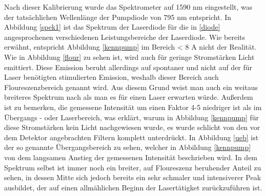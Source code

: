 Nach dieser Kalibrierung wurde das Spektrometer auf 1590 nm eingestellt, was der tatsächlichen Wellenlänge der Pumpdiode von 795 nm entspricht. \newline
In Abbildung \ref{spek1} ist das Spektrum der Laserdiode für die in \ref{diode} angesprochenen verschiedenen Leistungsbereiche der Laserdiode. Wie bereits erwähnt, entspricht Abbildung \ref{kennpump} im Bereich \newline < 8 A nicht der Realität. Wie in Abbildung \ref{flour} zu sehen ist, wird auch für geringe Stromstärken Licht emittiert. Diese Emission beruht allerdings auf spontaner und nicht auf der für Laser benötigten stimulierten Emission, weshalb dieser Bereich auch Floureszenzbereich genannt wird. Aus diesem Grund weist man auch ein weitaus breiteres Spektrum nach als man es für einen Laser erwarten würde. Außerdem ist zu bemerken, die gemessene Intensität um einen Faktor 4-5 niedriger ist als im Übergangs - oder Laserbereich, was erklärt, warum in Abbildung \ref{kennpump} für diese Stromstärken kein Licht nachgewiesen wurde, es wurde schlicht von den vor dem Detektor angebrachten Filtern komplett unterdrückt. \newline 
In Abbildung \ref{ueb} ist der so genannte Übergangsbereich zu sehen, welcher in Abbildung \ref{kennpump} von dem langsamen Anstieg der gemessenen Intensität beschrieben wird. In dem Spektrum selbst ist immer noch ein breiter, auf Floureszenz beruhender Anteil zu sehen, in dessen Mitte sich jedoch bereits ein sehr schmaler und intensiverer Peak ausbildet, der auf einen allmählichen Beginn der Lasertätigket zurückzuführen ist.

